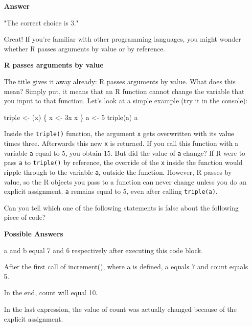 \documentclass[]{article}
\newcommand{\hlnum}[1]{\textcolor[rgb]{0.816,0.125,0.439}{#1}}%
\newcommand{\hlstr}[1]{\textcolor[rgb]{0.251,0.627,0.251}{#1}}%
\newcommand{\hlstd}[1]{\textcolor[rgb]{0.251,0.251,0.251}{#1}}%
\newcommand{\hlkwd}[1]{\textcolor[rgb]{0.878,0.439,0.125}{#1}}%
\newenvironment{Shaded}{\begin{myshaded}}{\end{myshaded}}
\renewenvironment{verbatim}{\color{codecolor}\begin{myshaded}\begin{oldverbatim}}{\end{oldverbatim}\end{myshaded}}
\newcommand{\KeywordTok}[1]{\hlkwd{#1}}
\newcommand{\DecValTok}[1]{\hlnum{#1}}
\newcommand{\StringTok}[1]{\hlstr{#1}}
\newcommand{\NormalTok}[1]{\hlstd{#1}}
\begin{document}
\textbf{Answer}

\begin{verbatim}
   [1] "The correct choice is 3."
\end{verbatim}

Great! If you're familiar with other programming languages, you might
wonder whether R passes arguments by value or by reference.

\textbf{R passes arguments by value}

The title gives it away already: R passes arguments by value. What does
this mean? Simply put, it means that an R function cannot change the
variable that you input to that function. Let's look at a simple example
(try it in the console):

\begin{Shaded}
\begin{Highlighting}[]
\NormalTok{triple <-}\StringTok{ }\NormalTok{(x) \{}
\NormalTok{x <-}\StringTok{ }\DecValTok{3}\OperatorTok{*}\NormalTok{x}
\NormalTok{x}
\NormalTok{\}}
\NormalTok{a <-}\StringTok{ }\DecValTok{5}
\KeywordTok{triple}\NormalTok{(a)}
\NormalTok{a}
\end{Highlighting}
\end{Shaded}

Inside the \texttt{triple()} function, the argument \texttt{x} gets
overwritten with its value times three. Afterwards this new \texttt{x}
is returned. If you call this function with a variable \texttt{a} equal
to 5, you obtain 15. But did the value of \texttt{a} change? If R were
to pass \texttt{a} to \texttt{triple()} by reference, the override of
the \texttt{x} inside the function would ripple through to the variable
\texttt{a}, outside the function. However, R passes by value, so the R
objects you pass to a function can never change unless you do an
explicit assignment. \texttt{a} remains equal to 5, even after calling
\texttt{triple(a)}.

Can you tell which one of the following statements is false about the
following piece of code?

\textbf{Possible Answers}

\begin{Shaded}
\begin{Highlighting}[]

\OperatorTok{*}\StringTok{ }\NormalTok{a and b equal }\DecValTok{7}\NormalTok{ and }\DecValTok{6}\NormalTok{ respectively after executing this code block.}

\OperatorTok{*}\StringTok{ }\NormalTok{After the first call of }\KeywordTok{increment}\NormalTok{(), where a is defined, a equals }\DecValTok{7}\NormalTok{ and count equals }\DecValTok{5}\NormalTok{.}

\OperatorTok{*}\StringTok{ }\NormalTok{In the end, count will equal }\DecValTok{10}\NormalTok{.}

\OperatorTok{*}\StringTok{ }\NormalTok{In the last expression, the value of count was actually changed because of the explicit assignment.}
\end{Highlighting}
\end{Shaded}
\end{document}
